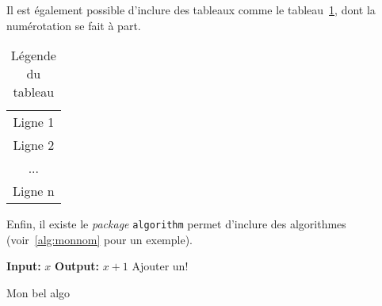 
Il est également possible d'inclure des tableaux comme le
tableau~\ref{tbl:monnom}, dont la numérotation se fait à part.

\begin{table}[ht]
  \centering
  \begin{tabular}{|c|}
  \hline
  Ligne 1 \\
  Ligne 2 \\
  ... \\
  Ligne n \\
  \hline
  \end{tabular}
  \caption{Légende du tableau}
  \label{tbl:monnom}
\end{table}


Enfin, il existe le \emph{package} \texttt{algorithm} permet d'inclure
des algorithmes (voir~\ref{alg:monnom} pour un exemple).

\begin{algorithm}
\begin{algorithmic}[1]
  \Statex \textbf{Input:} $x$
  \Statex \textbf{Output:} $x+1$
  \State Ajouter un!
\end{algorithmic}
\caption{Mon bel algo}\label{alg:monnom}
\end{algorithm}




%
%
%
